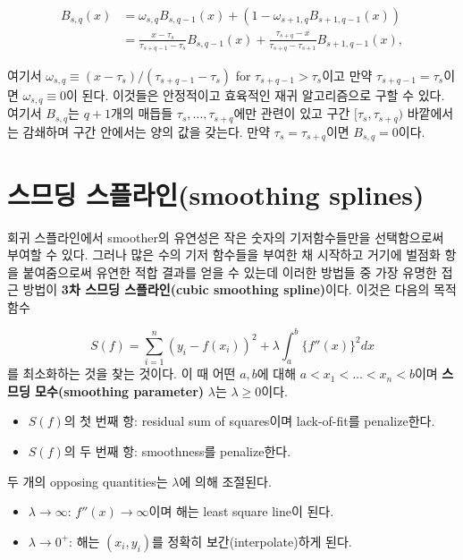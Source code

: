 \documentclass[b5paper,]{scrbook}
\theoremstyle{plain}
\theoremstyle{definition}
\numberwithin{equation}{section}
\begin{document}
\begin{align*}
B_{s,q}(x)&=\omega_{s,q}B_{s,q-1}(x)+(1-\omega_{s+1,q}B_{s+1,q-1}(x))\\
&=\frac{x-\tau_{s}}{\tau_{s+q-1}-\tau_{s}}B_{s,q-1}(x) + \frac{\tau_{s+q}-x}{\tau_{s+q}-\tau_{s+1}}B_{s+1,q-1}(x),
\end{align*}

여기서 \(\omega_{s,q}\equiv (x-\tau_{s})/(\tau_{s+q-1}-\tau_{s})\) for \(\tau_{s+q-1}>\tau_{s}\)이고 만약 \(\tau_{s+q-1}=\tau_{s}\)이면 \(\omega_{s,q}\equiv 0\)이 된다. 이것들은 안정적이고 효육적인 재귀 알고리즘으로 구할 수 있다. 여기서 \(B_{s,q}\)는 \(q+1\)개의 매듭들 \(\tau_{s},\ldots, \tau_{s+q}\)에만 관련이 있고 구간 \([\tau_{s},\tau_{s+q})\) 바깥에서는 감쇄하며 구간 안에서는 양의 값을 갖는다. 만약 \(\tau_{s}=\tau_{s+q}\)이면 \(B_{s,q}=0\)이다.

\hypertarget{-smoothing-splines}{%
\section{스므딩 스플라인(smoothing splines)}\label{-smoothing-splines}}

회귀 스플라인에서 smoother의 유연성은 작은 숫자의 기저함수들만을 선택함으로써 부여할 수 있다. 그러나 많은 수의 기저 함수들을 부여한 채 시작하고 거기에 벌점화 항을 붙여줌으로써 유연한 적합 결과를 얻을 수 있는데 이러한 방법들 중 가장 유명한 접근 방법이 \textbf{3차 스므딩 스플라인(cubic smoothing spline)}이다. 이것은 다음의 목적함수

\[S(f)=\sum_{i=1}^{n}(y_{i}-f(x_{i}))^{2}+\lambda \int_{a}^{b}\{f''(x)\}^{2}dx\]
를 최소화하는 것을 찾는 것이다. 이 때 어떤 \(a,b\)에 대해 \(a < x_{1} <\ldots <x_{n} <b\)이며 \textbf{스므딩 모수(smoothing parameter)} \(\lambda\)는 \(\lambda \geq 0\)이다.

\begin{itemize}
\item
  \(S(f)\)의 첫 번째 항: residual sum of squares이며 lack-of-fit를 penalize한다.
\item
  \(S(f)\)의 두 번째 항: smoothness를 penalize한다.
\end{itemize}

두 개의 opposing quantities는 \(\lambda\)에 의해 조절된다.

\begin{itemize}
\item
  \(\lambda\rightarrow\infty\): \(f''(x)\rightarrow\infty\)이며 해는 least square line이 된다.
\item
  \(\lambda \rightarrow 0^{+}\): 해는 \((x_{i}, y_{i})\)를 정확히 보간(interpolate)하게 된다.
\end{itemize}
\end{document}
